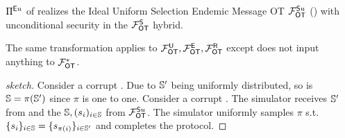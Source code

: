 \begin{lemma}
	$\Pi^{\mathsf{E} u}$ of  realizes the  Ideal Uniform Selection Endemic Message OT $\mathcal{F}_{\mathsf{OT}}^{\mathsf{S} u}$ () with unconditional security in the $\mathcal{F}_{\mathsf{OT}}^{\mathsf{S}}$ hybrid.
\end{lemma}

\begin{remark}
	The same transformation applies to $\mathcal{F}_{\mathsf{OT}}^\mathsf{U},\mathcal{F}_{\mathsf{OT}}^\mathsf{E}, \mathcal{F}_{\mathsf{OT}}^\mathsf{R}$ except \send does not input anything to $\mathcal{F}_{\mathsf{OT}}^*$.
\end{remark}
 

\begin{proof}[sketch]
	Consider a corrupt \send. Due to $\mathsf{\mathbb S}'$ being uniformly distributed, so is $\mathsf{\mathbb S}=\pi(\mathsf{\mathbb S}')$ since $\pi$ is one to one. Consider a corrupt \rec. The simulator receives $\mathsf{\mathbb S}'$ from \rec and the $\mathsf{\mathbb S},(s_i)_{i\in\mathsf{\mathbb S}}$ from $\mathcal{F}_{\mathsf{OT}}^{\mathsf{S} u}$. The simulator uniformly samples $\pi$ s.t. $\{s_i\}_{i\in\mathsf{\mathbb S}} =\{s_{\pi(i)}\}_{i\in\mathsf{\mathbb S}'}$ and completes the protocol.
	\pe
\end{proof}